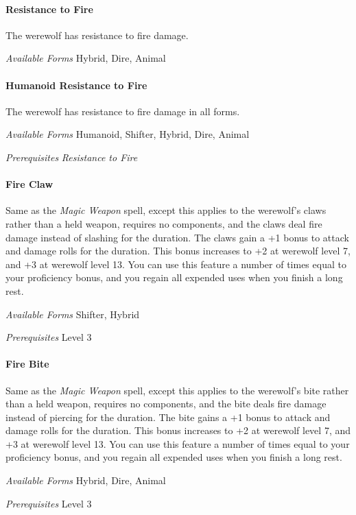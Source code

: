 \documentclass[twocolumn]{dndbook}
\begin{document}
\paragraph*{Resistance to Fire}
The werewolf has resistance to fire damage.\par
\emph{Available Forms} Hybrid, Dire, Animal\par

\paragraph*{Humanoid Resistance to Fire}
The werewolf has resistance to fire damage in all forms.\par
\emph{Available Forms} Humanoid, Shifter, Hybrid, Dire, Animal\par
\emph{Prerequisites} \emph{Resistance to Fire}\par

\paragraph*{Fire Claw}
Same as the \emph{Magic Weapon} spell, except this applies to the werewolf's claws rather than a held weapon, requires no components, and the claws deal fire damage instead of slashing for the duration.
The claws gain a +1 bonus to attack and damage rolls for the duration.
This bonus increases to +2 at werewolf level 7, and +3 at werewolf level 13.
You can use this feature a number of times equal to your proficiency bonus, and you regain all expended uses when you finish a long rest.\par
\emph{Available Forms} Shifter, Hybrid\par
\emph{Prerequisites} Level 3\par

\paragraph*{Fire Bite}
Same as the \emph{Magic Weapon} spell, except this applies to the werewolf's bite rather than a held weapon, requires no components, and the bite deals fire damage instead of piercing for the duration.
The bite gains a +1 bonus to attack and damage rolls for the duration.
This bonus increases to +2 at werewolf level 7, and +3 at werewolf level 13.
You can use this feature a number of times equal to your proficiency bonus, and you regain all expended uses when you finish a long rest.\par
\emph{Available Forms} Hybrid, Dire, Animal\par
\emph{Prerequisites} Level 3\par
\end{document}
